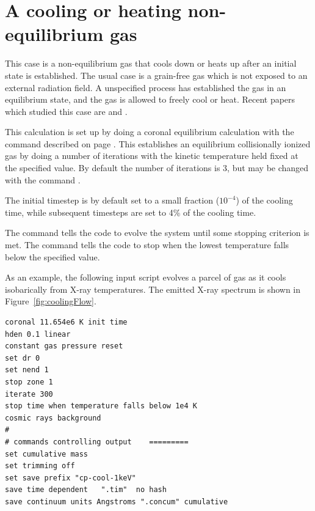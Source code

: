 \section{A cooling or heating non-equilibrium gas}
\label{sec:Cooling-Heating-NonEq}

This case is a non-equilibrium gas that cools down or heats up
after an initial state is established.
The usual case is a grain-free gas which is not exposed to
an external radiation field.
A unspecified process has established the gas in an equilibrium
state, and the gas is allowed to freely cool or heat.
Recent papers which studied this case are
\citet{Chatzikos2015} and \citet{GnatSternberg07}.

This calculation is set up by doing a coronal equilibrium
calculation with the  command
described on page \pageref{sec:CommandCoronalEquilibrium}.
This establishes an equilibrium collisionally ionized
gas by doing a number of iterations with the kinetic temperature
held fixed at the specified value.
By default the number of iterations is 3, but may be changed
with the command .

The initial timestep is by default set to a small fraction
($10^{-4}$) of the cooling time, while subsequent timesteps
are set to 4\% of the cooling time.

The  command tells the code to evolve
the system until some stopping criterion is met.
The command 
tells the code to stop when the lowest temperature falls
below the specified value.

As an example, the following input script evolves a parcel of gas
as it cools isobarically from X-ray temperatures.
The emitted X-ray spectrum is shown in Figure~\ref{fig:coolingFlow}.
%
\begin{verbatim}
coronal 11.654e6 K init time
hden 0.1 linear
constant gas pressure reset
set dr 0
set nend 1
stop zone 1
iterate 300
stop time when temperature falls below 1e4 K
cosmic rays background
#
# commands controlling output    =========
set cumulative mass
set trimming off
set save prefix "cp-cool-1keV"
save time dependent   ".tim"  no hash
save continuum units Angstroms ".concum" cumulative
\end{verbatim}

